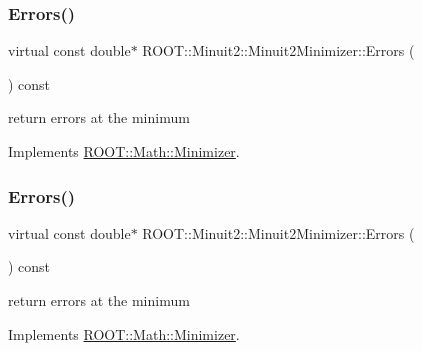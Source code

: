 \subsubsection{\texorpdfstring{Errors()}{Errors()}\hspace{0.1cm}{\footnotesize\ttfamily [2/3]}}
{\footnotesize\ttfamily virtual const double$\ast$ R\+O\+O\+T\+::\+Minuit2\+::\+Minuit2\+Minimizer\+::\+Errors (\begin{DoxyParamCaption}{ }\end{DoxyParamCaption}) const\hspace{0.3cm}{\ttfamily [virtual]}}



return errors at the minimum 



Implements \mbox{\hyperlink{classROOT_1_1Math_1_1Minimizer_a42f71e22f16cf4c59b621cf7e1e75f3d}{R\+O\+O\+T\+::\+Math\+::\+Minimizer}}.

\mbox{\label{classROOT_1_1Minuit2_1_1Minuit2Minimizer_a69c6dd9654ce41856814b358570cb9d7}} 
\subsubsection{\texorpdfstring{Errors()}{Errors()}\hspace{0.1cm}{\footnotesize\ttfamily [3/3]}}
{\footnotesize\ttfamily virtual const double$\ast$ R\+O\+O\+T\+::\+Minuit2\+::\+Minuit2\+Minimizer\+::\+Errors (\begin{DoxyParamCaption}{ }\end{DoxyParamCaption}) const\hspace{0.3cm}{\ttfamily [virtual]}}



return errors at the minimum 



Implements \mbox{\hyperlink{classROOT_1_1Math_1_1Minimizer_a42f71e22f16cf4c59b621cf7e1e75f3d}{R\+O\+O\+T\+::\+Math\+::\+Minimizer}}.

\mbox{\label{classROOT_1_1Minuit2_1_1Minuit2Minimizer_a004057cf512dcbd986799fabe756cecc}} 
